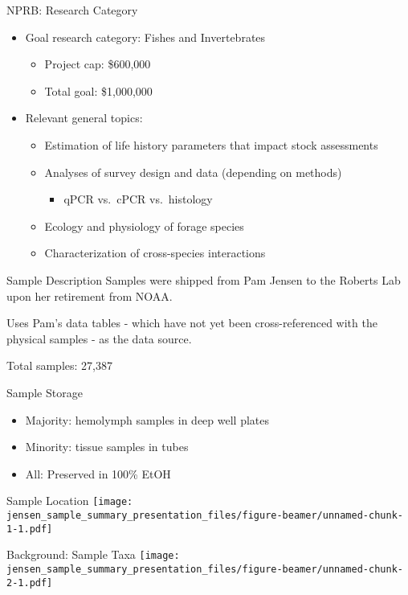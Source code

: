 \documentclass[
  ignorenonframetext,
]{beamer}
\providecommand{\tightlist}{%
  \setlength{\itemsep}{0pt}\setlength{\parskip}{0pt}}
\begin{document}
\begin{frame}{NPRB: Research Category}
\protect\hypertarget{nprb-research-category}{}
\begin{itemize}
\tightlist
\item
  Goal research category: Fishes and Invertebrates

  \begin{itemize}
  \tightlist
  \item
    Project cap: \$600,000
  \item
    Total goal: \$1,000,000
  \end{itemize}
\item
  Relevant general topics:

  \begin{itemize}
  \tightlist
  \item
    Estimation of life history parameters that impact stock assessments
  \item
    Analyses of survey design and data (depending on methods)

    \begin{itemize}
    \tightlist
    \item
      qPCR vs.~cPCR vs.~histology
    \end{itemize}
  \item
    Ecology and physiology of forage species
  \item
    Characterization of cross-species interactions
  \end{itemize}
\end{itemize}
\end{frame}

\begin{frame}{Sample Description}
\protect\hypertarget{sample-description}{}
Samples were shipped from Pam Jensen to the Roberts Lab upon her
retirement from NOAA.

Uses Pam's data tables - which have not yet been cross-referenced with
the physical samples - as the data source.

Total samples: 27,387
\end{frame}

\begin{frame}{Sample Storage}
\protect\hypertarget{sample-storage}{}
\begin{itemize}
\tightlist
\item
  Majority: hemolymph samples in deep well plates
\item
  Minority: tissue samples in tubes
\item
  All: Preserved in 100\% EtOH
\end{itemize}
\end{frame}

\begin{frame}{Sample Location}
\protect\hypertarget{sample-location}{}
\texttt{[image: jensen\_sample\_summary\_presentation\_files/figure-beamer/unnamed-chunk-1-1.pdf]}
\end{frame}

\begin{frame}{Background: Sample Taxa}
\protect\hypertarget{background-sample-taxa}{}
\texttt{[image: jensen\_sample\_summary\_presentation\_files/figure-beamer/unnamed-chunk-2-1.pdf]}
\end{frame}
\end{document}
